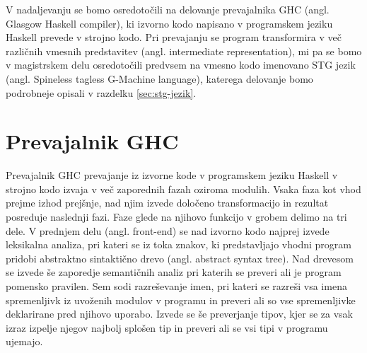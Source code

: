 V nadaljevanju se bomo osredotočili na delovanje prevajalnika GHC (angl. Glasgow Haskell compiler), ki izvorno kodo napisano v programskem jeziku Haskell prevede v strojno kodo. Pri prevajanju se program transformira v več različnih vmesnih predstavitev (angl. intermediate representation), mi pa se bomo v magistrskem delu osredotočili predvsem na vmesno kodo imenovano STG jezik (angl. Spineless tagless G-Machine language), katerega delovanje bomo podrobneje opisali v razdelku \ref{sec:stg-jezik}.


\section{Prevajalnik GHC}
\label{sec:prevajalnik-ghc}

Prevajalnik GHC prevajanje iz izvorne kode v programskem jeziku Haskell v strojno kodo izvaja v več zaporednih fazah oziroma modulih. Vsaka faza kot vhod prejme izhod prejšnje, nad njim izvede določeno transformacijo in rezultat posreduje naslednji fazi. Faze glede na njihovo funkcijo v grobem delimo na tri dele. V prednjem delu (angl. front-end) se nad izvorno kodo najprej izvede leksikalna analiza, pri kateri se iz toka znakov, ki predstavljajo vhodni program pridobi abstraktno sintaktično drevo (angl. abstract syntax tree). Nad drevesom se izvede še zaporedje semantičnih analiz pri katerih se preveri ali je program pomensko pravilen. Sem sodi razreševanje imen, pri kateri se razreši vsa imena spremenljivk iz uvoženih modulov v programu in preveri ali so vse spremenljivke deklarirane pred njihovo uporabo. Izvede se še preverjanje tipov, kjer se za vsak izraz izpelje njegov najbolj splošen tip in preveri ali se vsi tipi v programu ujemajo.

